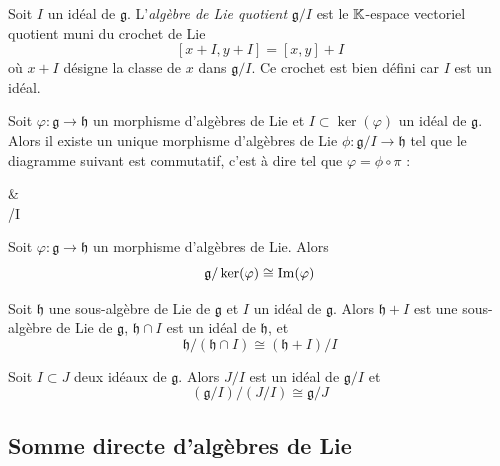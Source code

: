 \begin{definition}
    Soit $I$ un idéal de $\mathfrak{g}$. L'\emph{algèbre de Lie quotient} $\mathfrak{g}/I$ est le $\mathbb{K}$-espace vectoriel quotient muni du crochet de Lie
    $$[x+I, y+I] = [x,y]+I$$
    où $x + I$ désigne la classe de $x$ dans $\mathfrak{g}/I$. Ce crochet est bien défini car $I$ est un idéal.
\end{definition}

\begin{theorem}
    Soit $\varphi : \mathfrak{g} \to \mathfrak{h}$ un morphisme d'algèbres de Lie et $I \subset \ker(\varphi)$ un idéal de $\mathfrak{g}$. Alors il existe un unique morphisme d'algèbres de Lie $\phi : \mathfrak{g}/I \to \mathfrak{h}$ tel que le diagramme suivant est commutatif, c'est à dire tel que $\varphi = \phi \circ \pi$ :
    \begin{diag}
         \arrow[r, "\varphi"] \arrow[d, epi, "\pi"'] &  \\
        /I 
    \end{diag}
\end{theorem}

\omitted

\begin{corollary}
    Soit $\varphi : \mathfrak{g} \to \mathfrak{h}$ un morphisme d'algèbres de Lie. Alors
    $$\mathfrak{g}/\ker(\varphi) \cong \operatorname{Im}(\varphi)$$
\end{corollary}

\omitted

\begin{theorem}
    Soit $\mathfrak{h}$ une sous-algèbre de Lie de $\mathfrak{g}$ et $I$ un idéal de $\mathfrak{g}$. Alors $\mathfrak{h} + I$ est une sous-algèbre de Lie de $\mathfrak{g}$, $\mathfrak{h} \cap I$ est un idéal de $\mathfrak{h}$, et
    $$\mathfrak{h}/(\mathfrak{h} \cap I) \cong (\mathfrak{h} + I)/I$$
\end{theorem}

\omitted

\begin{theorem}
    Soit $I \subset J$ deux idéaux de $\mathfrak{g}$. Alors $J/I$ est un idéal de $\mathfrak{g}/I$ et
    $$(\mathfrak{g}/I)/(J/I) \cong \mathfrak{g}/J$$
\end{theorem}

\omitted

\subsection{Somme directe d'algèbres de Lie}

